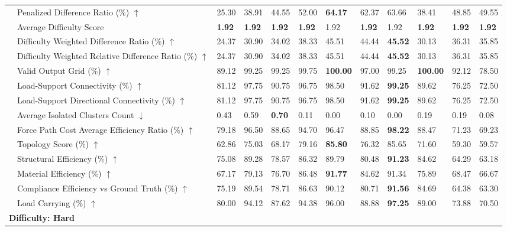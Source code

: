 \begin{table}[!h]
{\begin{tabular}{llllllllllll}
 & Penalized Difference Ratio (\%) $\uparrow$ & 25.30 & 38.91 & 44.55 & 52.00 & \textbf{64.17} & 62.37 & 63.66 & 38.41 & 48.85 & 49.55 \\
 & Average Difficulty Score & \textbf{1.92} & \textbf{1.92} & \textbf{1.92} & \textbf{1.92} & 1.92 & \textbf{1.92} & 1.92 & \textbf{1.92} & \textbf{1.92} & \textbf{1.92} \\
 & Difficulty Weighted Difference Ratio (\%) $\uparrow$ & 24.37 & 30.90 & 34.02 & 38.33 & 45.51 & 44.44 & \textbf{45.52} & 30.13 & 36.31 & 35.85 \\
 & Difficulty Weighted Relative Difference Ratio (\%) $\uparrow$ & 24.37 & 30.90 & 34.02 & 38.33 & 45.51 & 44.44 & \textbf{45.52} & 30.13 & 36.31 & 35.85 \\
 & Valid Output Grid (\%) $\uparrow$ & 89.12 & 99.25 & 99.25 & 99.75 & \textbf{100.00} & 97.00 & 99.25 & \textbf{100.00} & 92.12 & 78.50 \\
 & Load-Support Connectivity (\%) $\uparrow$ & 81.12 & 97.75 & 90.75 & 96.75 & 98.50 & 91.62 & \textbf{99.25} & 89.62 & 76.25 & 72.50 \\
 & Load-Support Directional Connectivity (\%) $\uparrow$ & 81.12 & 97.75 & 90.75 & 96.75 & 98.50 & 91.62 & \textbf{99.25} & 89.62 & 76.25 & 72.50 \\
 & Average Isolated Clusters Count $\downarrow$ & 0.43 & 0.59 & \textbf{0.70} & 0.11 & 0.00 & 0.10 & 0.00 & 0.19 & 0.19 & 0.08 \\
 & Force Path Cost Average Efficiency Ratio (\%) $\uparrow$ & 79.18 & 96.50 & 88.65 & 94.70 & 96.47 & 88.85 & \textbf{98.22} & 88.47 & 71.23 & 69.23 \\
 & Topology Score (\%) $\uparrow$ & 62.86 & 75.03 & 68.17 & 79.16 & \textbf{85.80} & 76.32 & 85.65 & 71.60 & 59.30 & 59.57 \\
 & Structural Efficiency (\%) $\uparrow$ & 75.08 & 89.28 & 78.57 & 86.32 & 89.79 & 80.48 & \textbf{91.23} & 84.62 & 64.29 & 63.18 \\
 & Material Efficiency (\%) $\uparrow$ & 67.17 & 79.13 & 76.70 & 86.48 & \textbf{91.77} & 84.62 & 91.34 & 75.89 & 68.47 & 66.67 \\
 & Compliance Efficiency vs Ground Truth (\%) $\uparrow$ & 75.19 & 89.54 & 78.71 & 86.63 & 90.12 & 80.71 & \textbf{91.56} & 84.69 & 64.38 & 63.30 \\
 & Load Carrying (\%) $\uparrow$ & 80.00 & 94.12 & 87.62 & 94.38 & 96.00 & 88.88 & \textbf{97.25} & 89.00 & 73.88 & 70.50 \\
\midrule
\multicolumn{12}{l}{\textbf{Difficulty: Hard}}\\

\end{tabular}}
\end{table}
